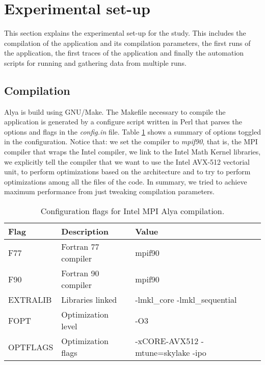 \section{Experimental set-up}

This section explains the experimental set-up for the study. This includes the compilation of the application and its compilation parameters, the first runs of the application, the first traces of the application and finally the automation scripts for running and gathering data from multiple runs. 

\subsection{Compilation}

Alya is build using GNU/Make\cite{gnumake}. The Makefile necessary to compile the application is generated by a configure script written in Perl that parses the options and flags in the \textit{config.in} file. Table \ref{flagsintel} shows a summary of options toggled in the configuration. Notice that: we set the compiler to \textit{mpif90}, that is, the MPI compiler that wraps the Intel compiler,  we link to the Intel Math Kernel libraries\cite{intelmkl}, we explicitly tell the compiler that we want to use the Intel AVX-512 vectorial unit, to perform optimizations based on the architecture and to try to perform optimizations among all the files of the code.  In summary, we tried to achieve maximum performance from just tweaking compilation parameters.

\begin{table}[htbp]
\centering
\begin{tabular}{l|l|l} 
\toprule
\textbf{Flag}     & \textbf{Description}         & \textbf{Value}                                                                       \\ 
\hline
F77      & Fortran 77 compiler & mpif90                                                                      \\ 
\hline
F90      & Fortran 90 compiler & mpif90                                                                      \\ 
\hline
EXTRALIB & Libraries linked    & -lmkl\_core -lmkl\_sequential                                               \\ 
\hline 
FOPT     & Optimization level  & -O3                                                                         \\ 
\hline
OPTFLAGS & Optimization flags  & -xCORE-AVX512 -mtune=skylake -ipo                                           \\
\bottomrule
\end{tabular}
\caption{Configuration flags for Intel MPI Alya compilation.}
\label{flagsintel}
\end{table}


